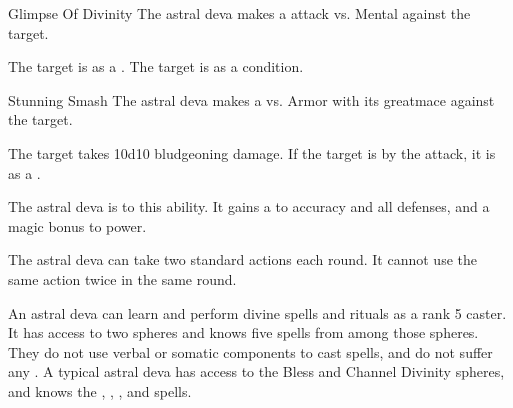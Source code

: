     \begin{freeability}{Glimpse Of Divinity}
       The astral deva makes a  attack
        vs. Mental against the target.
    
    \hit The target is  as a .
    \crit The target is  as a condition.
    \end{freeability}
  

    \begin{freeability}{Stunning Smash}
       The astral deva makes a 
         vs. Armor
        with its greatmace against the target.
    
    \hit The target takes 10d10 bludgeoning damage. If the target is  by the attack, it is  as a .
    \end{freeability}
  
              The astral deva is  to this ability.
              It gains a   to accuracy and all defenses, and a  magic bonus to power.
            
              The astral deva can take two standard actions each round.
              It cannot use the same action twice in the same round.
            
              An astral deva can learn and perform divine spells and rituals as a rank 5 caster.
              It has access to two spheres and knows five spells from among those spheres.
              They do not use verbal or somatic components to cast spells, and do not suffer any .
              A typical astral deva has access to the Bless and Channel Divinity spheres, and knows the , , ,  and  spells.
            
